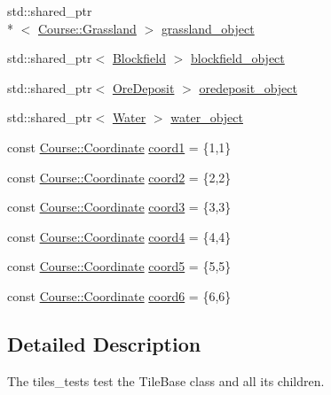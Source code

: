 \begin{DoxyCompactItemize}
std\-::shared\-\_\-ptr\\*
$<$ \hyperlink{classCourse_1_1Grassland}{Course\-::\-Grassland} $>$ \hyperlink{classdefault__tile_ad5fbacd1a3d966e10aa6127db0ba3213}{grassland\-\_\-object}
\item 
std\-::shared\-\_\-ptr$<$ \hyperlink{classGame_1_1Blockfield}{Blockfield} $>$ \hyperlink{classdefault__tile_a475f12ebc676bc8252ccea358329eb55}{blockfield\-\_\-object}
\item 
std\-::shared\-\_\-ptr$<$ \hyperlink{classGame_1_1OreDeposit}{Ore\-Deposit} $>$ \hyperlink{classdefault__tile_a267580dfeea7352f56f5bd106def49c5}{oredeposit\-\_\-object}
\item 
std\-::shared\-\_\-ptr$<$ \hyperlink{classGame_1_1Water}{Water} $>$ \hyperlink{classdefault__tile_a083dbfdbbd2f789667ce742cb26afe83}{water\-\_\-object}
\item 
const \hyperlink{classCourse_1_1Coordinate}{Course\-::\-Coordinate} \hyperlink{classdefault__tile_ad881db4d38fb6ce5f6344fd13ad35fc1}{coord1} = \{1,1\}
\item 
const \hyperlink{classCourse_1_1Coordinate}{Course\-::\-Coordinate} \hyperlink{classdefault__tile_afe8df9f0be2707e28ca52f2d63a6f565}{coord2} = \{2,2\}
\item 
const \hyperlink{classCourse_1_1Coordinate}{Course\-::\-Coordinate} \hyperlink{classdefault__tile_ad831dcb7909d9e7918380ed7ec7f0f8b}{coord3} = \{3,3\}
\item 
const \hyperlink{classCourse_1_1Coordinate}{Course\-::\-Coordinate} \hyperlink{classdefault__tile_adfe1e7d47661ef24230ed213d6860d0d}{coord4} = \{4,4\}
\item 
const \hyperlink{classCourse_1_1Coordinate}{Course\-::\-Coordinate} \hyperlink{classdefault__tile_a99eb8e09cd1e8bc821c1d410f0cefcdc}{coord5} = \{5,5\}
\item 
const \hyperlink{classCourse_1_1Coordinate}{Course\-::\-Coordinate} \hyperlink{classdefault__tile_a02b5556e362bb56edb63015f8a57aaa1}{coord6} = \{6,6\}
\end{DoxyCompactItemize}


\subsection{Detailed Description}
The tiles\-\_\-tests test the Tile\-Base class and all its children. 

